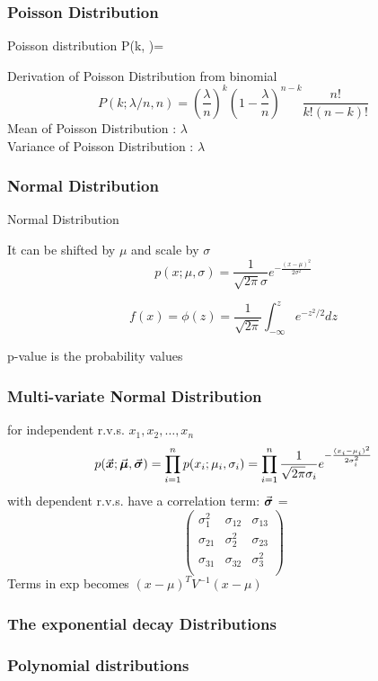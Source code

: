 \documentclass[12pt,a4paper]{article}
\begin{document}
\subsubsection{Poisson Distribution}
\begin{definition}
    {Poisson distribution}
    {P(k, \lambda)=}
    {}
\end{definition}
Derivation of Poisson Distribution from binomial
$$
P(k ; \lambda / n, n)=\left(\frac{\lambda}{n}\right)^k\left(1-\frac{\lambda}{n}\right)^{n-k} \frac{n !}{k !(n-k) !}
$$
Mean of Poisson Distribution : $\lambda$\\
Variance of Poisson Distribution : $\lambda$
\subsubsection{Normal Distribution}
\begin{definition}
    {Normal Distribution}{}{}
\end{definition}
It can be shifted by $\mu$ and scale by $\sigma$
$$
p(x;\mu, \sigma)=\frac{1}{\sqrt{2 \pi} \sigma} e^{-\frac{(x-\mu)^2}{2 \sigma^2}}
$$

$$
f(x) = \phi(z) = \frac{1}{\sqrt{2\pi}}\int^z_{-\infty}{e^{-z^2/2} dz}
$$

p-value is the probability values
\subsubsection{Multi-variate Normal Distribution}
for independent r.v.s. $x_1, x_2, \ldots, x_n$ 
$$
p(\va*{x};\va*{\mu},\va*{\sigma}) = \prod_{i=1}^n p(x_i;\mu_i,\sigma_i) = \prod_{i=1}^n \frac{1}{\sqrt{2 \pi} \sigma_i} e^{-\frac{(x_i-\mu_i)^2}{2 \sigma_i^2}}
$$
with dependent r.v.s. have a correlation term:
$\va*{\sigma}$ = 
$$
\begin{pmatrix}
    \sigma_1^2 & \sigma_{12} & \sigma_{13} \\
    \sigma_{21} & \sigma_2^2 & \sigma_{23} \\
    \sigma_{31} & \sigma_{32} & \sigma_3^2 \\
\end{pmatrix}
$$
Terms in exp becomes
$(x-\mu)^T V^{-1} (x-\mu)$
\subsubsection{The exponential decay Distributions}
\subsubsection{Polynomial distributions}
\end{document}
